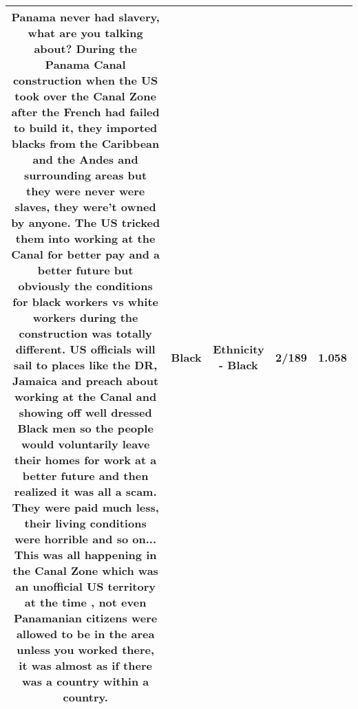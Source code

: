 \documentclass[11pt]{article}
\newlength\mylength
\begin{document}
\begin{center}
\begin{longtable}{|C{.65\mylength}|C{.30\mylength}|C{.12\mylength}|C{.12\mylength}|C{.12\mylength}|}
  \small Panama never had slavery, what are you talking about? During the Panama Canal construction when the US took over the Canal Zone after the French had failed to build it, they imported blacks from the Caribbean and the Andes and surrounding areas but they were never were slaves, they were't owned by anyone. The US tricked them into working at the Canal for better pay and a better future but obviously the conditions for \textbf{black} workers vs white workers during the construction was totally different. US officials will sail to places like the DR, Jamaica  and preach about working at the Canal and showing off well dressed \textbf{Black} men so the people would voluntarily leave their homes for work at a better future and then realized it was all a scam. They were paid much less, their living conditions were horrible and so on... This was all happening in the Canal Zone which was an unofficial US territory at the time , not even Panamanian citizens were allowed to be in the area unless you worked there, it was almost as if there was a country within a country.\normalsize   & Black & Ethnicity - Black & 2/189 & 1.058 \\  \hline

\end{longtable}
\end{center}
\end{document}
